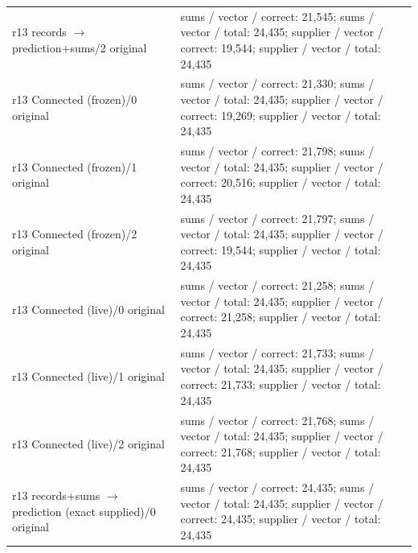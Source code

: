 \begin{longtable}{@{}>{\raggedright\arraybackslash}p{1.800in}>{\raggedright\arraybackslash}p{4.200in}@{}}
r13 records $\to$ prediction+sums/\allowbreak{}2 original & sums /\allowbreak{} vector /\allowbreak{} correct: 21,545; sums /\allowbreak{} vector /\allowbreak{} total: 24,435; supplier /\allowbreak{} vector /\allowbreak{} correct: 19,544; supplier /\allowbreak{} vector /\allowbreak{} total: 24,435 \\
r13 Connected (frozen)/\allowbreak{}0 original & sums /\allowbreak{} vector /\allowbreak{} correct: 21,330; sums /\allowbreak{} vector /\allowbreak{} total: 24,435; supplier /\allowbreak{} vector /\allowbreak{} correct: 19,269; supplier /\allowbreak{} vector /\allowbreak{} total: 24,435 \\
r13 Connected (frozen)/\allowbreak{}1 original & sums /\allowbreak{} vector /\allowbreak{} correct: 21,798; sums /\allowbreak{} vector /\allowbreak{} total: 24,435; supplier /\allowbreak{} vector /\allowbreak{} correct: 20,516; supplier /\allowbreak{} vector /\allowbreak{} total: 24,435 \\
r13 Connected (frozen)/\allowbreak{}2 original & sums /\allowbreak{} vector /\allowbreak{} correct: 21,797; sums /\allowbreak{} vector /\allowbreak{} total: 24,435; supplier /\allowbreak{} vector /\allowbreak{} correct: 19,544; supplier /\allowbreak{} vector /\allowbreak{} total: 24,435 \\
r13 Connected (live)/\allowbreak{}0 original & sums /\allowbreak{} vector /\allowbreak{} correct: 21,258; sums /\allowbreak{} vector /\allowbreak{} total: 24,435; supplier /\allowbreak{} vector /\allowbreak{} correct: 21,258; supplier /\allowbreak{} vector /\allowbreak{} total: 24,435 \\
r13 Connected (live)/\allowbreak{}1 original & sums /\allowbreak{} vector /\allowbreak{} correct: 21,733; sums /\allowbreak{} vector /\allowbreak{} total: 24,435; supplier /\allowbreak{} vector /\allowbreak{} correct: 21,733; supplier /\allowbreak{} vector /\allowbreak{} total: 24,435 \\
r13 Connected (live)/\allowbreak{}2 original & sums /\allowbreak{} vector /\allowbreak{} correct: 21,768; sums /\allowbreak{} vector /\allowbreak{} total: 24,435; supplier /\allowbreak{} vector /\allowbreak{} correct: 21,768; supplier /\allowbreak{} vector /\allowbreak{} total: 24,435 \\
r13 records+sums $\to$ prediction (exact supplied)/\allowbreak{}0 original & sums /\allowbreak{} vector /\allowbreak{} correct: 24,435; sums /\allowbreak{} vector /\allowbreak{} total: 24,435; supplier /\allowbreak{} vector /\allowbreak{} correct: 24,435; supplier /\allowbreak{} vector /\allowbreak{} total: 24,435 \\

\end{longtable}

